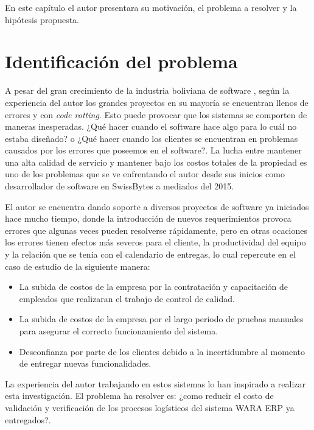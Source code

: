 \linespread{1.25}
\noindent
En este capítulo el autor presentara su motivación, el problema a resolver y la hipótesis propuesta.

\section*{Identificación del problema}
\noindent
A pesar del gran crecimiento de la industria boliviana de software \citet{sfldb_13}, según la experiencia del autor los grandes proyectos en su mayoría se encuentran llenos de errores y con \textit{code rotting}. Esto puede provocar que los sistemas se comporten de maneras inesperadas. ¿Qué hacer cuando el software hace algo para lo cuál no estaba diseñado? o ¿Qué hacer cuando los clientes se encuentran en problemas causados por los errores que poseemos en el software?. La lucha entre mantener una alta calidad de servicio y mantener bajo los costos totales de la propiedad es uno de los problemas que se ve enfrentando el autor desde sus inicios como desarrollador de software en SwissBytes a mediados del 2015.

\vspace{5mm}
\noindent
El autor se encuentra dando soporte a diversos proyectos de software ya iniciados hace mucho tiempo, donde la introducción de nuevos requerimientos provoca errores que algunas veces pueden resolverse rápidamente, pero en otras ocaciones los errores tienen efectos más severos para el cliente, la productividad del equipo y la relación que se tenia con el calendario de entregas, lo cual repercute en el caso de estudio de la siguiente manera:
\begin{itemize}
    \item La subida de costos de la empresa por la contratación y capacitación de empleados que realizaran el trabajo de control de calidad.
    \item La subida de costos de la empresa por el largo periodo de pruebas manuales para asegurar el correcto funcionamiento del sistema.
    \item Desconfianza por parte de los clientes debido a la incertidumbre al momento de entregar nuevas funcionalidades.
\end{itemize}
La experiencia del autor trabajando en estos sistemas lo han inspirado a realizar esta investigación. El problema ha resolver es: ¿como reducir el costo de validación y verificación de los procesos logísticos del sistema WARA ERP ya entregados?.


